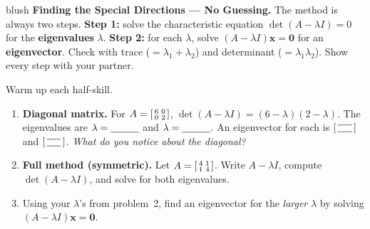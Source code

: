 \documentclass[10pt]{article}
\newcommand{\xx}{\mathbf{x}}
\newcommand{\zero}{\mathbf{0}}
\begin{document}
\namepartnerperiod

\vspace{0.10in}

\begin{headlinebox}{blush}
\small\textbf{Finding the Special Directions --- No Guessing.} The method is always two steps.
\textbf{Step 1:} solve the characteristic equation $\det(A-\lambda I)=0$ for the \textbf{eigenvalues}
$\lambda$. \textbf{Step 2:} for each $\lambda$, solve $(A-\lambda I)\xx=\zero$ for an
\textbf{eigenvector}. Check with trace ($=\lambda_1+\lambda_2$) and determinant ($=\lambda_1\lambda_2$).
Show every step with your partner.
\end{headlinebox}

\vspace{0.08in}

\begin{tcolorbox}[colback=white, colframe=black!40, title=\textbf{Tier R --- Remediate},
    fonttitle=\bfseries, arc=1.5mm, left=3mm, right=3mm, top=2mm, bottom=2mm, breakable]
Warm up each half-skill.
\begin{enumerate}[leftmargin=1.7em, itemsep=9pt]
  \item \textbf{Diagonal matrix.} For $A=\begin{bsmallmatrix} 6 & 0\\ 0 & 2 \end{bsmallmatrix}$,
        $\det(A-\lambda I)=(6-\lambda)(2-\lambda)$. The eigenvalues are $\lambda=\blank{1.0cm}$ and
        $\lambda=\blank{1.0cm}$. An eigenvector for each is $\begin{bsmallmatrix}\blank{0.5cm}\\[1pt]\blank{0.5cm}\end{bsmallmatrix}$
        and $\begin{bsmallmatrix}\blank{0.5cm}\\[1pt]\blank{0.5cm}\end{bsmallmatrix}$. \emph{What do you notice about the diagonal?} \writeline
  \item \textbf{Full method (symmetric).} Let $A=\begin{bsmallmatrix} 4 & 1\\ 1 & 4 \end{bsmallmatrix}$.
        Write $A-\lambda I$, compute $\det(A-\lambda I)$, and solve for both eigenvalues. 
  \item Using your $\lambda$'s from problem~2, find an eigenvector for the \emph{larger} $\lambda$ by
        solving $(A-\lambda I)\xx=\zero$. \writeline
\end{enumerate}
\end{tcolorbox}
\end{document}
